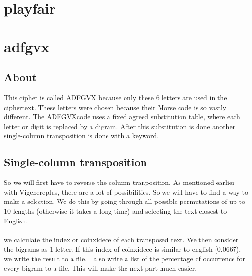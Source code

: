 \documentclass{article}
\begin{document}
\section{playfair}
\section{adfgvx}
\subsection{About}
This cipher is called ADFGVX because only these 6 letters are used in the ciphertext. These letters were chosen because their Morse code is so vastly different. The ADFGVXcode uses a fixed agreed substitution table, where each letter or digit is replaced by a digram.  After this substitution is done another single-column transposition is done with a keyword.
\subsection{Single-column transposition}
So we will first have to reverse the column tranposition. As mentioned earlier with Vigenereplus, there are a lot of possibilities. So we will have to find a way to make a selection. We do this by going through all possible permutations of up to 10 lengths (otherwise it takes a long time) and selecting the text closest to English.\\
\\
we calculate the index or coinxidece of each transposed text. We then consider the bigrams as 1 letter. If this index of coinxidece is similar to english (0.0667), we write the result to a file. I also write a list of the percentage of occurrence for every bigram to a file. This will make the next part much easier.
\end{document}
